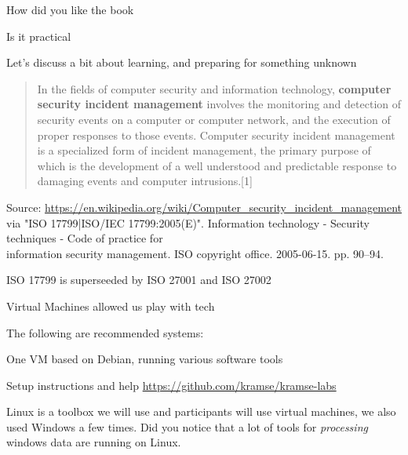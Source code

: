 \documentclass[Screen16to9,17pt]{foils}
\begin{document}
\begin{list2}
\item How did you like the book
\item Is it practical
\item Let's discuss a bit about learning, and preparing for something unknown
\end{list2}



\begin{quote}
In the fields of computer security and information technology, {\bf computer security incident management} involves the monitoring and detection of security events on a computer or computer network, and the execution of proper responses to those events. Computer security incident management is a specialized form of incident management, the primary purpose of which is the development of a well understood and predictable response to damaging events and computer intrusions.[1]
\end{quote}
Source: \url{https://en.wikipedia.org/wiki/Computer_security_incident_management} \\
via "ISO 17799|ISO/IEC 17799:2005(E)". Information technology - Security techniques - Code of practice for\\ information security management. ISO copyright office. 2005-06-15. pp. 90–94.

\begin{list2}
\item ISO 17799 is superseeded by ISO 27001 and ISO 27002
\end{list2}




Virtual Machines allowed us play with tech

The following are recommended systems:
\begin{list2}
\item One VM based on Debian, running various software tools
\item Setup instructions and help \url{https://github.com/kramse/kramse-labs}
\end{list2}

Linux is a toolbox we will use and participants will use virtual machines, we also used Windows a few times. Did you notice that a lot of tools for \emph{processing} windows data are running on Linux.
\end{document}

